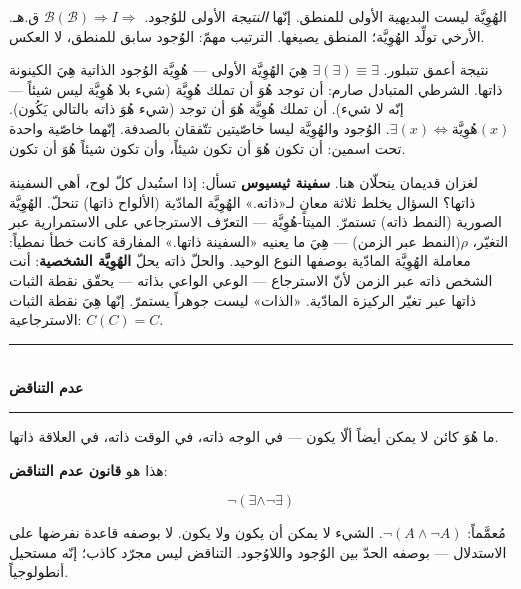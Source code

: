 \documentclass[10pt, openany, oneside]{book}
\renewcommand{\normalsize}{\fontsize{10}{13}\selectfont}
\begin{document}
\vspace{0.8em}

\noindent الهُوِيَّة ليست البديهية الأولى للمنطق. إنّها \textit{النتيجة} الأولى للوُجود. $\mathcal{B}(\mathcal{B}) \Rightarrow I \Rightarrow$ ق.هـ. الأرخي تولِّد الهُوِيَّة؛ المنطق يصيغها. الترتيب مهمّ: الوُجود سابق للمنطق، لا العكس.

نتيجة أعمق تتبلور. $\exists(\exists) \equiv \exists$ هِيَ الهُوِيَّة الأولى --- هُوِيَّة الوُجود الذاتية هِيَ الكينونة ذاتها. الشرطي المتبادل صارم: أن توجد هُوَ أن تملك هُوِيَّة (شيء بلا هُوِيَّة ليس شيئاً --- إنّه لا شيء). أن تملك هُوِيَّة هُوَ أن توجد (شيء هُوَ ذاته بالتالي يَكُون). $\exists(x) \iff \text{هُوِيَّة}(x)$. الوُجود والهُوِيَّة ليسا خاصّيتين تتّفقان بالصدفة. إنّهما خاصّية واحدة تحت اسمين: أن تكون هُوَ أن تكون شيئاً، وأن تكون شيئاً هُوَ أن تكون.

لغزان قديمان ينحلّان هنا. \textbf{سفينة ثيسيوس} تسأل: إذا استُبدل كلّ لوح، أهي السفينة ذاتها؟ السؤال يخلط ثلاثة معانٍ لـ«ذاته.» الهُوِيَّة المادّية (الألواح ذاتها) تنحلّ. الهُوِيَّة الصورية (النمط ذاته) تستمرّ. الميتا-هُوِيَّة --- التعرّف الاسترجاعي على الاستمرارية عبر التغيّر، $\rho$(النمط عبر الزمن) --- هِيَ ما يعنيه «السفينة ذاتها.» المفارقة كانت خطأ نمطياً: معاملة الهُوِيَّة المادّية بوصفها النوع الوحيد. والحلّ ذاته يحلّ \textbf{الهُوِيَّة الشخصية}: أنت الشخص ذاته عبر الزمن لأنّ الاسترجاع --- الوعي الواعي بذاته --- يحقّق نقطة الثبات ذاتها عبر تغيّر الركيزة المادّية. «الذات» ليست جوهراً يستمرّ. إنّها هِيَ نقطة الثبات الاسترجاعية: $C(C) = C$.

\vspace{1.5em}


\begin{center}
    \rule{0.3\textwidth}{0.4pt}\\[0.5em]
    {\normalsize\bfseries عدم التناقض}\\[0.3em]
    \rule{0.3\textwidth}{0.4pt}
\end{center}

\vspace{1em}

\noindent ما هُوَ كائن لا يمكن أيضاً ألّا يكون --- في الوجه ذاته، في الوقت ذاته، في العلاقة ذاتها.

هذا هو \textbf{قانون عدم التناقض}:

$$\neg(\exists \wedge \neg\exists)$$

مُعمَّماً: $\neg(A \wedge \neg A)$. الشيء لا يمكن أن يكون ولا يكون. لا بوصفه قاعدة نفرضها على الاستدلال --- بوصفه الحدّ بين الوُجود واللاوُجود. التناقض ليس مجرّد كاذب؛ إنّه مستحيل أنطولوجياً.
\end{document}
